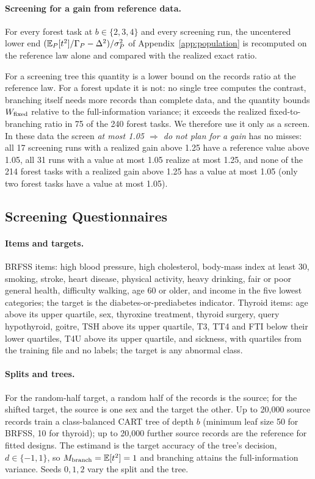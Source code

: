 \paragraph{Screening for a gain from reference data.}
For every forest task at $b\in\{2,3,4\}$ and every screening run, the uncentered lower end $(\mathbb{E}_P[t^2]/\Gamma_P-\Delta^2)/\sigma_P^2$ of Appendix~\ref{app:population} is recomputed on the reference law alone and compared with the realized exact ratio.

For a screening tree this quantity is a lower bound on the records ratio at the reference law. For a forest update it is not: no single tree computes the contrast, branching itself needs more records than complete data, and the quantity bounds $W_{\rm fixed}$ relative to the full-information variance; it exceeds the realized fixed-to-branching ratio in 75 of the 240 forest tasks. We therefore use it only as a screen. In these data the screen \emph{at most 1.05 $\Rightarrow$ do not plan for a gain} has no misses: all 17 screening runs with a realized gain above 1.25 have a reference value above 1.05, all 31 runs with a value at most 1.05 realize at most 1.25, and none of the 214 forest tasks with a realized gain above 1.25 has a value at most 1.05 (only two forest tasks have a value at most 1.05).

\subsection{Screening Questionnaires}\label{app:screening}\label{app:screendetail}
\paragraph{Items and targets.}
BRFSS items: high blood pressure, high cholesterol, body-mass index at least 30, smoking, stroke, heart disease, physical activity, heavy drinking, fair or poor general health, difficulty walking, age 60 or older, and income in the five lowest categories; the target is the diabetes-or-prediabetes indicator. Thyroid items: age above its upper quartile, sex, thyroxine treatment, thyroid surgery, query hypothyroid, goitre, TSH above its upper quartile, T3, TT4 and FTI below their lower quartiles, T4U above its upper quartile, and sickness, with quartiles from the training file and no labels; the target is any abnormal class.

\paragraph{Splits and trees.}
For the random-half target, a random half of the records is the source; for the shifted target, the source is one sex and the target the other. Up to 20,000 source records train a class-balanced CART tree of depth $b$ (minimum leaf size 50 for BRFSS, 10 for thyroid); up to 20,000 further source records are the reference for fitted designs. The estimand is the target accuracy of the tree's decision, $d\in\{-1,1\}$, so $M_{\rm branch}=\mathbb{E}[t^2]=1$ and branching attains the full-information variance. Seeds $0,1,2$ vary the split and the tree.

